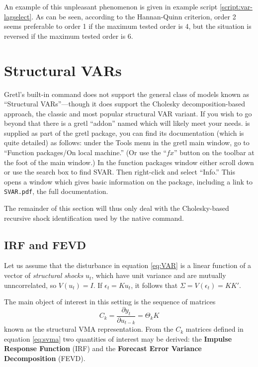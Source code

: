 An example of this unpleasant phenomenon is given in example script
\ref{script:var-lagselect}. As can be seen, according to the
Hannan-Quinn criterion, order 2 seems preferable to order 1 if the
maximum tested order is 4, but the situation is reversed if the
maximum tested order is 6.

\section{Structural VARs}
\label{sec:svar}

Gretl's built-in  command does not support the general class
of models known as ``Structural VARs''---though it does support the
Cholesky decomposition-based approach, the classic and most popular
structural VAR variant. If you wish to go beyond that there is a gretl ``addon''
named  which will likely meet your needs.  is
supplied as part of the gretl package, you can find its documentation
(which is quite detailed) as follows: under the \textsf{Tools} menu in
the gretl main window, go to ``Function packages/On local machine.''
(Or use the ``$fx$'' button on the toolbar at the foot of the main
window.) In the function packages window either scroll down or use the
search box to find \textsf{SVAR}. Then right-click and select
``Info.'' This opens a window which gives basic information on the
package, including a link to \texttt{SVAR.pdf}, the full
documentation.

The remainder of this section will thus only deal with the Cholesky-based
recursive shock identification used by the native  command.

\subsection{IRF and FEVD}

Let us assume that the disturbance in equation \eqref{eq:VAR} is a
linear function of a vector of \emph{structural shocks} $u_t$, which
have unit variance and are mutually unncorrelated, so $V(u_t) = I$. If
$\epsilon_t = K u_t$, it follows that $\Sigma = V(\epsilon_t) = KK'$.

The main object of interest in this setting is the sequence of
matrices
\begin{equation}
  \label{eq:svma}
  C_k = \frac{\partial y_t}{\partial u_{t-k}} = \Theta_k K
\end{equation}
known as the structural VMA representation. From the $C_k$ matrices
defined in equation \eqref{eq:svma} two quantities of interest may be
derived: the \textbf{Impulse Response Function} (IRF) and the
\textbf{Forecast Error Variance Decomposition} (FEVD).

